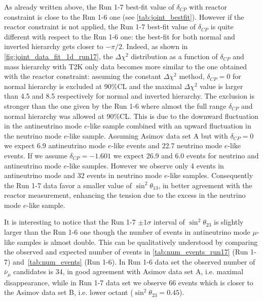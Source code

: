As already written above, the Run 1-7 best-fit value of $\delta_{CP}$ with reactor constraint is 
close to the Run 1-6 one (see \cref{tab:joint_bestfit}).
However if the reactor constraint is not applied, the Run 1-7 best-fit value of $\delta_{CP}$
is quite different with respect to the Run 1-6 one:
the best-fit for both normal and inverted hierarchy gets closer to $-\pi/2$.
Indeed, as shown in \cref{fig:joint_data_fit_1d_run17}, 
the $\Delta \chi^2$ distribution as a function of $\delta_{CP}$ and mass hierarchy
with T2K only data becomes more similar to the one obtained with the reactor constraint:
assuming the constant $\Delta \chi^2$ method, $\delta_{CP}=0$ for normal hierarchy
is excluded at 90\%CL and the maximal $\Delta \chi^2$ value is 
larger than 4.5 and 8.5 respectively for normal and inverted hierarchy.
The exclusion is stronger than the one given by the Run 1-6 where
almost the full range $\delta_{CP}$ and normal hierarchy was allowed at 90\%CL.
This is due to the downward fluctuation in the antineutrino mode $e$-like sample
combined with an upward fluctuation in the neutrino mode $e$-like sample.
Assuming Asimov data set A but with $\delta_{CP} = 0$ we expect 6.9
antineutrino mode $e$-like events and 22.7 neutrino mode $e$-like events.
If we assume $\delta_{CP}=-1.601$ we expect 26.9 and 6.0 events 
for neutrino and antineutrino mode $e$-like samples.
However we observe only 4 events in antineutrino mode and 
32 events in neutrino mode $e$-like samples.
Consequently the Run 1-7 data favor a smaller value of $\sin^2 \theta_{13}$,
in better agreement with the reactor measurement,
enhancing the tension due to the excess in the neutrino mode $e$-like sample.

It is interesting to notice that the Run 1-7 $\pm 1\sigma$ interval of $\sin^2 \theta_{23}$ is slightly larger
than the Run 1-6 one though the number of events in antineutrino mode $\mu$-like samples is almost double. 
This can be qualitatively understood by comparing the observed and expected number of events
in \cref{tab:num_events_run17} (Run 1-7) and~\ref{tab:num_events} (Run 1-6).
In Run 1-6 data set the observed number of $\bar{\nu}_{\mu}$ candidates is 34, in good agreement
with Asimov data set A, i.e. maximal disappearance, while in Run 1-7 data set we observe 66 events
which is closer to the Asimov data set B, i.e. lower octant ($\sin^2 \theta_{23} = 0.45$).


